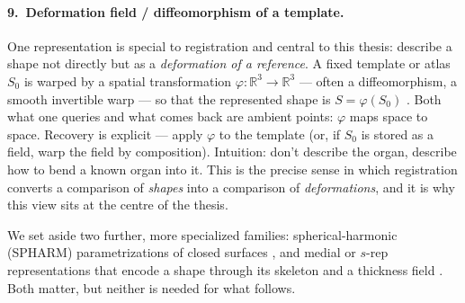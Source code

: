 \paragraph{9.~Deformation field / diffeomorphism of a template.} One representation is special
to registration and central to this thesis: describe a shape not directly but as a
\emph{deformation of a reference}. A fixed template or atlas $S_0$ is warped by a spatial
transformation $\varphi : \mathbb{R}^3 \to \mathbb{R}^3$ --- often a diffeomorphism, a smooth
invertible warp --- so that the represented shape is $S = \varphi(S_0)$
\citep{beg2005lddmm, balakrishnan2019voxelmorph}. Both what one queries and what comes back are
ambient points: $\varphi$ maps space to space. Recovery is explicit --- apply $\varphi$ to the
template (or, if $S_0$ is stored as a field, warp the field by composition). Intuition: don't
describe the organ, describe how to bend a known organ into it. This is the precise sense in
which registration converts a comparison of \emph{shapes} into a comparison of
\emph{deformations}, and it is why this view sits at the centre of the thesis.

We set aside two further, more specialized families: spherical-harmonic (SPHARM)
parametrizations of closed surfaces \citep{styner2006framework}, and medial or
\mbox{$s$-rep} representations that encode a shape through its skeleton and a thickness field
\citep{pizer2003deformable}. Both matter, but neither is needed for what follows.

